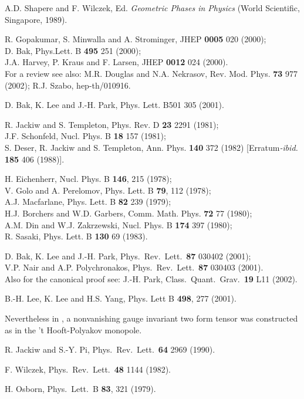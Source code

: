 \documentclass[a4paper,12pt]{article}
\begin{document}
\begin{thebibliography}{99}
 A.D. Shapere and F. Wilczek, Ed. {\it
Geometric Phases in Physics} (World Scientific, Singapore, 1989).






  R. Gopakumar, S. Minwalla and A. Strominger, JHEP {\bf 0005} 020 (2000);\\
D. Bak, Phys.Lett. B {\bf 495}  251 (2000);\\ J.A. Harvey, P. Kraus and F. Larsen, JHEP {\bf 0012}  024 (2000).
\\For a review see also: M.R. Douglas and N.A. Nekrasov, Rev. Mod. Phys. {\bf 73}  977 (2002); R.J. Szabo, hep-th/010916.

 D. Bak, K. Lee and J.-H.  Park, Phys. Lett. B501  305 (2001).


 R. Jackiw and S. Templeton, Phys. Rev. D {\bf 23}
 2291 (1981);\\ J.F. Schonfeld, Nucl. Phys. B {\bf 18}  157 (1981);\\
S. Deser, R. Jackiw and S. Templeton,  Ann. Phys.  {\bf 140}  372 (1982)
[Erratum{\textit{-ibid.}} {\bf 185}  406 (1988)].


 H. Eichenherr, Nucl. Phys. B {\bf 146}, 215 (1978);\\
V. Golo and A. Perelomov, Phys. Lett. B {\bf 79}, 112 (1978);\\
A.J. Macfarlane, Phys. Lett. B {\bf 82} {239} (1979);\\
 H.J. Borchers and W.D. Garbers, Comm. Math. Phys. {\bf 72} 77 (1980);\\
 A.M. Din and W.J. Zakrzewski, Nucl. Phys. B {\bf 174} {397} (1980);\\
  R. Sasaki, Phys. Lett. B {\bf 130} 69 (1983).

D. Bak, K. Lee and J.-H. Park, Phys.\ Rev.\ Lett.\  {\bf 87} 030402 (2001);\\ V.P. Nair and A.P. Polychronakos,
Phys.\ Rev.\ Lett.\  {\bf 87}  030403 (2001).\\
Also for the canonical proof see:  J.-H. Park,  Class.\ Quant.\
Grav.\ {\bf 19} L11 (2002).

 B.-H. Lee, K. Lee and H.S. Yang, Phys. Lett B {\bf 498}, 277 (2001).

 Nevertheless in \cite{nard}, a nonvanishing gauge invariant two form tensor was constructed as in the 't
Hooft-Polyakov monopole.

 R. Jackiw and S.-Y. Pi,  Phys.\ Rev.\ Lett.\ {\bf 64} 2969 (1990).



 F. Wilczek, Phys.\ Rev.\ Lett.\ {\bf 48} {1144} (1982).


 H. Osborn, Phys.\ Lett.\ B {\bf 83}, 321 (1979).



\end{thebibliography}
\end{document}

